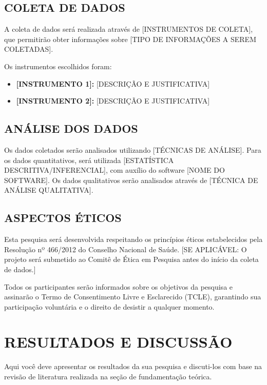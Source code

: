 \subsection{COLETA DE DADOS}
\label{subsec:coleta-dados}

A coleta de dados será realizada através de [INSTRUMENTOS DE COLETA], que permitirão obter informações sobre [TIPO DE INFORMAÇÕES A SEREM COLETADAS].

Os instrumentos escolhidos foram:
\begin{itemize}
    \item \textbf{[INSTRUMENTO 1]:} [DESCRIÇÃO E JUSTIFICATIVA]
    \item \textbf{[INSTRUMENTO 2]:} [DESCRIÇÃO E JUSTIFICATIVA]
\end{itemize}

\subsection{ANÁLISE DOS DADOS}
\label{subsec:analise-dados}

Os dados coletados serão analisados utilizando [TÉCNICAS DE ANÁLISE]. Para os dados quantitativos, será utilizada [ESTATÍSTICA DESCRITIVA/INFERENCIAL], com auxílio do software [NOME DO SOFTWARE]. Os dados qualitativos serão analisados através de [TÉCNICA DE ANÁLISE QUALITATIVA].

\subsection{ASPECTOS ÉTICOS}
\label{subsec:aspectos-eticos}

Esta pesquisa será desenvolvida respeitando os princípios éticos estabelecidos pela Resolução nº 466/2012 do Conselho Nacional de Saúde. [SE APLICÁVEL: O projeto será submetido ao Comitê de Ética em Pesquisa antes do início da coleta de dados.]

Todos os participantes serão informados sobre os objetivos da pesquisa e assinarão o Termo de Consentimento Livre e Esclarecido (TCLE), garantindo sua participação voluntária e o direito de desistir a qualquer momento.


\section{RESULTADOS E DISCUSSÃO}
\label{sec:consideracoes-finais}

Aqui você deve apresentar os resultados da sua pesquisa e discuti-los com base na revisão de literatura realizada na seção de fundamentação teórica.

